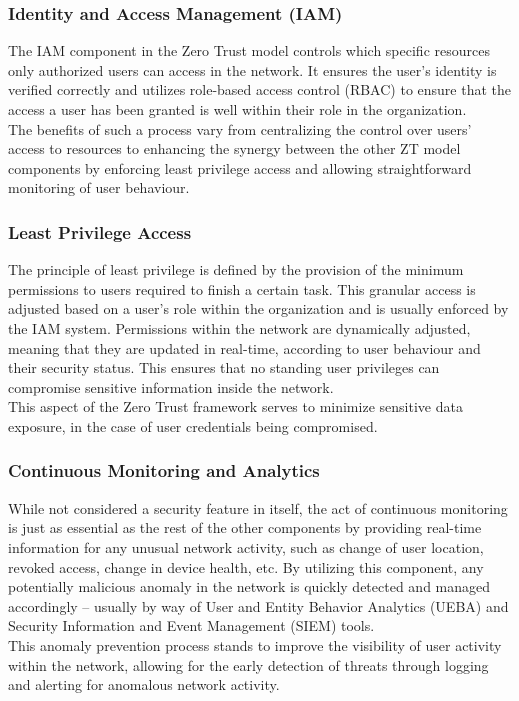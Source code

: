 \subsubsection{Identity and Access Management (IAM)}
The IAM component in the Zero Trust model controls which specific resources only authorized users can access in the network. It ensures the user's identity is verified correctly and utilizes role-based access control (RBAC) to ensure that the access a user has been granted is well within their role in the organization.\\
The benefits of such a process vary from centralizing the control over users' access to resources to enhancing the synergy between the other ZT model components by enforcing least privilege access and allowing straightforward monitoring of user behaviour.

\subsubsection{Least Privilege Access}
The principle of least privilege is defined by the provision of the minimum permissions to users required to finish a certain task. This granular access is adjusted based on a user's role within the organization and is usually enforced by the IAM system. Permissions within the network are dynamically adjusted, meaning that they are updated in real-time, according to user behaviour and their security status. This ensures that no standing user privileges can compromise sensitive information inside the network.\\
This aspect of the Zero Trust framework serves to minimize sensitive data exposure, in the case of user credentials being compromised. 

\subsubsection{Continuous Monitoring and Analytics}
While not considered a security feature in itself, the act of continuous monitoring is just as essential as the rest of the other components by providing real-time information for any unusual network activity, such as change of user location, revoked access, change in device health, etc. By utilizing this component, any potentially malicious anomaly in the network is quickly detected and managed accordingly -- usually by way of User and Entity Behavior Analytics (UEBA) and Security Information and Event Management (SIEM) tools.\\
This anomaly prevention process stands to improve the visibility of user activity within the network, allowing for the early detection of threats through logging and alerting for anomalous network activity.

